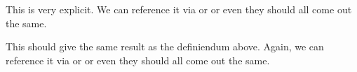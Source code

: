 \documentclass[minimal]{omdoc}
\begin{document}
\begin{module}[id=foomod]
  \begin{definition}[id=test.one]
    This  is very explicit. We can
    reference it via  or  or even
     they should all come out the same.
  \end{definition}

  \begin{definition}[id=test.two]
    This  should give the same result as the
    definiendum above. Again, we can
    reference it via  or  or even
     they should all come out the same.
  \end{definition}
\end{module}
\end{document}
